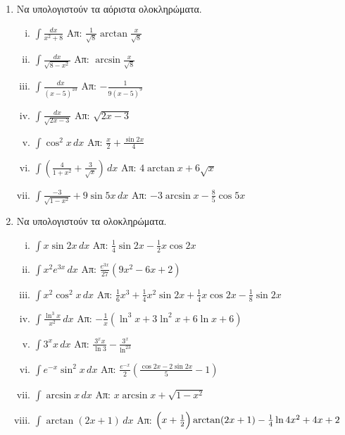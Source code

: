 


\pagestyle{askhseis}
\everymath{\displaystyle}



\begin{center}
\end{center}
\vspace{\baselineskip}
\begin{enumerate}

\item Να υπολογιστούν τα αόριστα ολοκληρώματα.


\begin{enumerate}[i)]
\item $\int\frac{dx}{x^2+8} $ \hfill Απ: $\frac{1}{\sqrt{8}} \arctan \frac{x}{\sqrt{8}}$
\item $\int\frac{dx}{\sqrt{8-x^{2}}} $ \hfill Απ: $\arcsin \frac{x}{\sqrt{8}}$
\item $\int\frac{dx}{(x-5)^{10}} $ \hfill Απ: $-\frac{1}{9(x-5)^9}$
\item $ \int\frac{dx}{\sqrt{2x-3}}$ \hfill Απ: $ \sqrt{2x-3} $
\item $\int\cos^2x \, dx$ \hfill Απ: $\frac{x}{2} + \frac{\sin2x}{4}$
\item $ \int \left(\frac{4}{1+x^{2}} + \frac{3}{\sqrt{x}}\right) \,{dx} $ \hfill Απ: $
	4 \arctan x + 6 \sqrt{x} $
\item $ \int \frac{-3}{\sqrt{1 - x^{2}}} + 9 \sin{5x} \,{dx}  $ \hfill Απ: $
	-3 \arcsin x - \frac{8}{5} \cos{5x} $
\end{enumerate}

\item Να υπολογιστούν τα ολοκληρώματα.

\begin{enumerate}[i)]
\item $\int x\sin2x \, dx$ \hfill Απ: $\frac{1}{4}\sin2x-\frac{1}{2}x\cos2x$
\item $\int x^2e^{3x} \, dx$ \hfill Απ: $\frac{e^{3x}}{27}(9x^2-6x+2)$
\item $\int x^2\cos^2x \, dx$ \hfill Απ: $\frac{1}{6}x^3 + \frac{1}{4}x^2\sin2x+\frac{1}{4}x\cos2x-\frac{1}{8}\sin2x$
\item $\int \frac{\ln^3x}{x^2} \, dx$ \hfill Απ: $-\frac{1}{x}(\ln^3x+3\ln^2x+6\ln x+6)$
\item $\int 3^{x}x \, dx$ \hfill Απ: $\frac{3^xx}{\ln3}-\frac{3^x}{\ln^23}$
\item $\int e^{-x}\sin^2x \, dx$ \hfill Απ: $\frac{e^{-x}}{2}\left(\frac{\cos2x-2\sin2x}{5}-1\right)$
\item $\int \arcsin x \, dx$ \hfill Απ: $x\arcsin x + \sqrt{1-x^2}$
\item $ \int \arctan(2x+1) \,{dx} $ \hfill Απ: $ \Bigl(x+ \frac{1}{2}\Bigr) \arctan(2x+1)
	- \frac{1}{4} \ln{4x^{2} + 4x +2}  $
\end{enumerate}


\end{enumerate}
